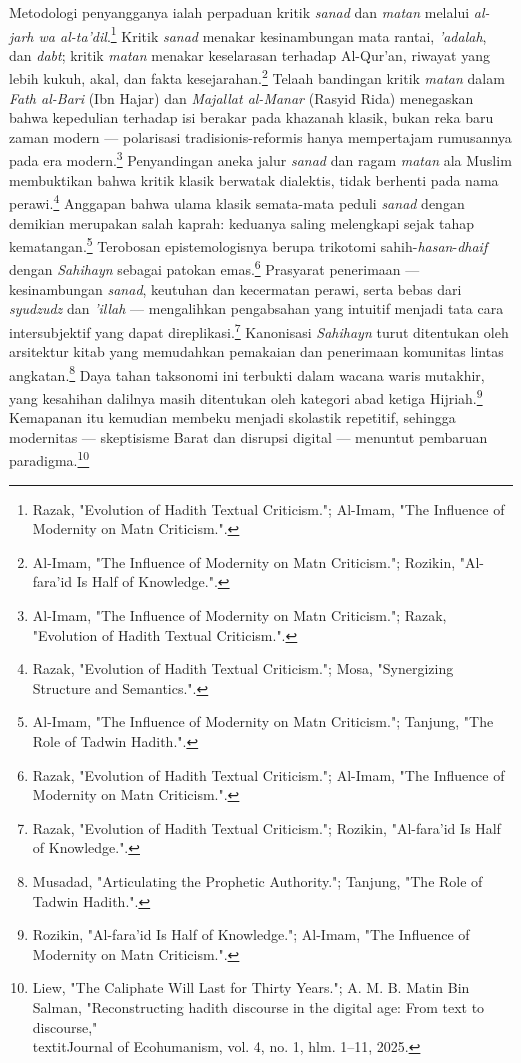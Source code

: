 Metodologi penyangganya ialah perpaduan kritik \textit{sanad} dan \textit{matan} melalui \textit{al-jarh wa al-ta'dil}.\footnote{Razak, "Evolution of Hadith Textual Criticism."; Al-Imam, "The Influence of Modernity on Matn Criticism.".} Kritik \textit{sanad} menakar kesinambungan mata rantai, \textit{'adalah}, dan \textit{dabt}; kritik \textit{matan} menakar keselarasan terhadap Al-Qur'an, riwayat yang lebih kukuh, akal, dan fakta kesejarahan.\footnote{Al-Imam, "The Influence of Modernity on Matn Criticism."; Rozikin, "Al-fara'id Is Half of Knowledge.".} Telaah bandingan kritik \textit{matan} dalam \textit{Fath al-Bari} (Ibn Hajar) dan \textit{Majallat al-Manar} (Rasyid Rida) menegaskan bahwa kepedulian terhadap isi berakar pada khazanah klasik, bukan reka baru zaman modern --- polarisasi tradisionis-reformis hanya mempertajam rumusannya pada era modern.\footnote{Al-Imam, "The Influence of Modernity on Matn Criticism."; Razak, "Evolution of Hadith Textual Criticism.".} Penyandingan aneka jalur \textit{sanad} dan ragam \textit{matan} ala Muslim membuktikan bahwa kritik klasik berwatak dialektis, tidak berhenti pada nama perawi.\footnote{Razak, "Evolution of Hadith Textual Criticism."; Mosa, "Synergizing Structure and Semantics.".} Anggapan bahwa ulama klasik semata-mata peduli \textit{sanad} dengan demikian merupakan salah kaprah: keduanya saling melengkapi sejak tahap kematangan.\footnote{Al-Imam, "The Influence of Modernity on Matn Criticism."; Tanjung, "The Role of Tadwin Hadith.".} Terobosan epistemologisnya berupa trikotomi sahih-\textit{hasan}-\textit{dhaif} dengan \textit{Sahihayn} sebagai patokan emas.\footnote{Razak, "Evolution of Hadith Textual Criticism."; Al-Imam, "The Influence of Modernity on Matn Criticism.".} Prasyarat penerimaan --- kesinambungan \textit{sanad}, keutuhan dan kecermatan perawi, serta bebas dari \textit{syudzudz} dan \textit{'illah} --- mengalihkan pengabsahan yang intuitif menjadi tata cara intersubjektif yang dapat direplikasi.\footnote{Razak, "Evolution of Hadith Textual Criticism."; Rozikin, "Al-fara'id Is Half of Knowledge.".} Kanonisasi \textit{Sahihayn} turut ditentukan oleh arsitektur kitab yang memudahkan pemakaian dan penerimaan komunitas lintas angkatan.\footnote{Musadad, "Articulating the Prophetic Authority."; Tanjung, "The Role of Tadwin Hadith.".} Daya tahan taksonomi ini terbukti dalam wacana waris mutakhir, yang kesahihan dalilnya masih ditentukan oleh kategori abad ketiga Hijriah.\footnote{Rozikin, "Al-fara'id Is Half of Knowledge."; Al-Imam, "The Influence of Modernity on Matn Criticism.".} Kemapanan itu kemudian membeku menjadi skolastik repetitif, sehingga modernitas --- skeptisisme Barat dan disrupsi digital --- menuntut pembaruan paradigma.\footnote{Liew, "The Caliphate Will Last for Thirty Years."; A. M. B. Matin Bin Salman, "Reconstructing hadith discourse in the digital age: From text to discourse," \\textit{Journal of Ecohumanism}, vol. 4, no. 1, hlm. 1--11, 2025.}

